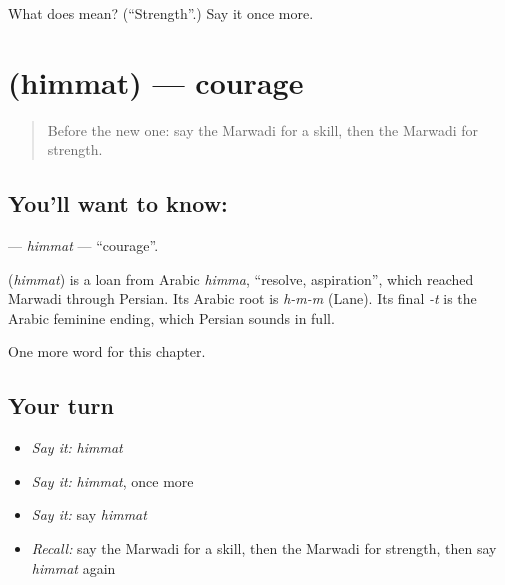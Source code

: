 \begin{tcolorbox}[breakable,colback=teal!4,colframe=teal!35!black,title={Before you move on}]
What does  mean? (\textquotedblleft{}Strength\textquotedblright{}.) Say it once more.
\end{tcolorbox}
\section[\texorpdfstring{\mw{हिम्मत} (himmat)}{हिम्मत (himmat)}]{ (himmat) — courage}

\label{lesson:MW-C114-himmat}



\begin{quote}
Before the new one: say the Marwadi for a skill, then the Marwadi for strength.
\end{quote}

\subsection*{You'll want to know: }
\textbf{} — \emph{himmat} — \textquotedblleft{}courage\textquotedblright{}.

\begin{cousinweb}
\textbf{} (\emph{himmat}) is a loan from Arabic \emph{himma}, \textquotedblleft{}resolve, aspiration\textquotedblright{}, which reached Marwadi through Persian. Its Arabic root is \emph{h-m-m} (Lane). Its final \emph{-t} is the Arabic feminine ending, which Persian sounds in full.
\end{cousinweb}

\begin{grammarlens}[title={What you've built}]
One more word for this chapter.
\end{grammarlens}

\subsection*{Your turn}
\begin{itemize}
\raggedright
  \item \emph{Say it:} \emph{himmat}
  \item \emph{Say it:} \emph{himmat}, once more
  \item \emph{Say it:} say \emph{himmat}
  \item \emph{Recall:} say the Marwadi for a skill, then the Marwadi for strength, then say \emph{himmat} again
\end{itemize}

